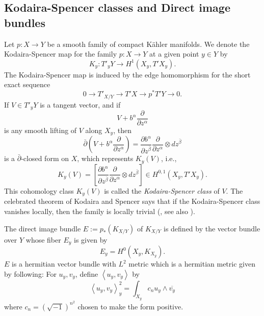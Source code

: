 \documentclass{amsart}
\theoremstyle{definition}
\numberwithin{equation}{section}
\begin{document}
\subsection{Kodaira-Spencer classes and Direct image bundles}

Let $p:X\rightarrow Y$ be a smooth family of compact K\"ahler manifolds. We denote the Kodaira-Spencer map for the family $p:X\rightarrow Y$ at a given point $y\in Y$ by
\begin{equation*}
K_y:T'_y Y\rightarrow
H^1(X_y,T'X_y).
\end{equation*}
The Kodaira-Spencer map is induced by the edge homomorphism for the short exact sequence
\begin{equation*}
0\rightarrow
T'_{X/Y}
\rightarrow
T'X
\rightarrow
p^*T'Y
\rightarrow0.
\end{equation*}
If $V\in T'_y Y$ is a tangent vector, and if 
\begin{equation*}
V+b^\alpha{\frac{\partial{}}{\partial{z^\alpha}}}
\end{equation*}
is any smooth lifting of $V$ along $X_y$, then 
\begin{equation*}
\bar\partial
{\left({
	V+b^\alpha{\frac{\partial{}}{\partial{z^\alpha}}}
}\right)}
=
{\frac{\partial{b^\alpha}}{\partial{z^{\bar\beta}}}}
{\frac{\partial{}}{\partial{z^\alpha}}}
\otimes
dz^{\bar\beta}
\end{equation*}
is a $\bar\partial$-closed form on $X$, which represents $K_y(V)$, i.e.,
\begin{equation*}
K_y(V)
=
\left[
{\frac{\partial{b^\alpha}}{\partial{z^{\bar\beta}}}}
{\frac{\partial{}}{\partial{z^\alpha}}}
\otimes
dz^{\bar\beta}
\right]
\in H^{0,1}(X_y,T'X_y).
\end{equation*}
This cohomology class $K_y(V)$ is called the \emph{Kodaira-Spencer class} of $V$. The celebrated theorem of Kodaira and Spencer says that if the Kodaira-Spencer class vanishes locally, then the family is locally trivial (\cite{Kodaira:Spencer}, see also \cite{Kodaira}).
\medskip

The direct image bundle $E:=p_*(K_{X/Y})$ of $K_{X/Y}$ is defined by the vector bundle over $Y$ whose fiber $E_y$ is given by
\begin{equation*}
E_y=H^0(X_y,K_{X_y}).
\end{equation*}
$E$ is a hermitian vector bundle with $L^2$ metric which is a hermitian metric given by following: For $u_y, v_y$, define ${\left\langle{{u_y,v_y}}\right\rangle}$ by
\begin{equation*}
{\left\langle{{u_y,v_y}}\right\rangle}_y^2
=
\int_{X_y}c_n u_y\wedge \overline{v_y}
\end{equation*}
where $c_n=({\sqrt{-1}})^{n^2}$ chosen to make the form positive. 
\end{document}
